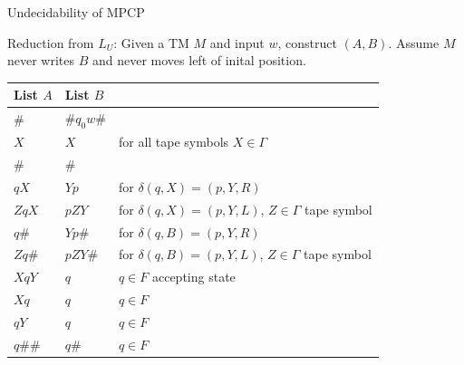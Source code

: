 \documentclass[handout]{beamer}
\begin{document}
\begin{frame}{Undecidability of MPCP}

    \alert{Reduction from  $L_U$:} Given a TM $M$ and input $w$, construct $(A,B)$. Assume $M$ never writes $B$ and never moves left of inital position.

    \begin{center}
        \begin{tabular}{l l || l}
            List $A$ & List $B$\\
            \hline\hline
            \# & \#$q_0w$\#\\
            \hline
            $X$ & $X$ & for all tape symbols $X\in \Gamma$\\
            \# & \#\\
            \hline
            $qX$ & $Yp$ & for $\delta(q,X)=(p,Y,R) $\\
            $ZqX$ & $pZY$ & for $\delta(q,X)=(p,Y,L)$, $Z \in \Gamma $ tape symbol\\
            $q\#$ & $Yp\#$ & for $\delta(q,B)=(p,Y,R)$\\
            $Zq\#$ & $pZY\#$ & for $\delta(q,B)=(p,Y,L)$, $Z \in \Gamma $ tape symbol\\
            \hline
            $XqY$ & $q$& $q\in F$ accepting state\\
            $Xq$ & $q$& $q\in F$\\
            $qY$ & $q$& $q\in F$\\
            $q\#\#$ & $q\#$& $q\in F$
        \end{tabular}
    \end{center}

\end{frame}
\end{document}
